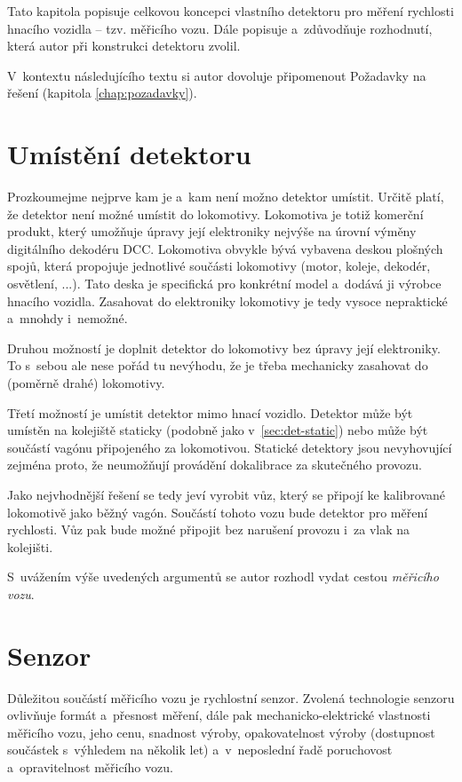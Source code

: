 Tato kapitola popisuje celkovou koncepci vlastního detektoru pro měření
rychlosti hnacího vozidla -- tzv. měřicího vozu. Dále popisuje
a~zdůvodňuje rozhodnutí, která autor při konstrukci detektoru zvolil.

V~kontextu následujícího textu si autor dovoluje připomenout Požadavky
na řešení (kapitola \ref{chap:pozadavky}).

\section{Umístění detektoru}
\label{sec:wsm-senzor-umisteni}

Prozkoumejme nejprve kam je a~kam není možno detektor umístit. Určitě platí, že
detektor není možné umístit do lokomotivy. Lokomotiva je totiž komerční produkt,
který umožňuje úpravy její elektroniky nejvýše na úrovní výměny digitálního
dekodéru DCC. Lokomotiva obvykle bývá vybavena deskou plošných spojů, která
propojuje jednotlivé součásti lokomotivy (motor, koleje, dekodér, osvětlení,
...). Tato deska je specifická pro konkrétní model a~dodává ji výrobce hnacího
vozidla. Zasahovat do elektroniky lokomotivy je tedy vysoce nepraktické
a~mnohdy i~nemožné.

Druhou možností je doplnit detektor do lokomotivy bez úpravy její elektroniky.
To s~sebou ale nese pořád tu nevýhodu, že je třeba mechanicky zasahovat do
(poměrně drahé) lokomotivy.

Třetí možností je umístit detektor mimo hnací vozidlo. Detektor může být
umístěn na kolejiště staticky (podobně jako v~\ref{sec:det-static}) nebo může
být součástí vagónu připojeného za lokomotivou. Statické detektory jsou
nevyhovující zejména proto, že neumožňují provádění dokalibrace za skutečného
provozu.

Jako nejvhodnější řešení se tedy jeví vyrobit vůz, který se připojí ke kalibrované
lokomotivě jako běžný vagón. Součástí tohoto vozu bude detektor pro měření
rychlosti. Vůz pak bude možné připojit bez narušení provozu i~za vlak na
 kolejišti.

S~uvážením výše uvedených argumentů se autor rozhodl vydat cestou
\textit{měřicího vozu}.

\section{Senzor}
\label{sec:wsm-senzor}

Důležitou součástí měřicího vozu je rychlostní senzor. Zvolená technologie
senzoru ovlivňuje formát a~přesnost měření, dále pak mechanicko-elektrické
vlastnosti měřicího vozu, jeho cenu, snadnost výroby, opakovatelnost výroby
(dostupnost součástek s~výhledem na několik let) a~v~neposlední řadě
poruchovost a~opravitelnost měřicího vozu.

